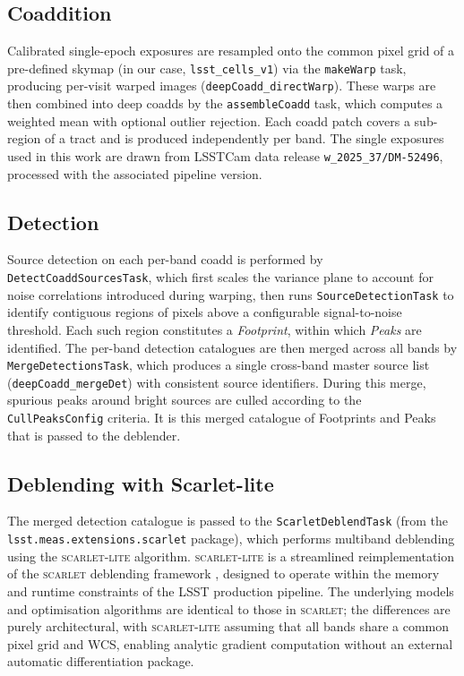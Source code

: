 \documentclass[DM,lsstdraft,authoryear,toc]{lsstdoc}
\newcommand{\scarlet}{\textsc{scarlet}\xspace}
\newcommand{\scarletlite}{\textsc{scarlet-lite}\xspace}
\newcommand{\task}[1]{\texttt{#1}\xspace}
\begin{document}
\subsection{Coaddition}
\label{sec:coaddition}

Calibrated single-epoch exposures are resampled onto the common pixel grid of
a pre-defined skymap (in our case, \texttt{lsst\_cells\_v1}) via the
\task{makeWarp} task, producing per-visit warped images
(\texttt{deepCoadd\_directWarp}). These warps are then combined into deep
coadds by the \task{assembleCoadd} task, which computes a weighted mean with
optional outlier rejection. Each coadd patch covers a sub-region of a tract
and is produced independently per band. The single exposures used in this work
are drawn from LSSTCam data release \texttt{w\_2025\_37/DM-52496}, processed
with the associated pipeline version.

\subsection{Detection}
\label{sec:detection}

Source detection on each per-band coadd is performed by
\task{DetectCoaddSourcesTask}, which first scales the variance plane to
account for noise correlations introduced during warping, then runs
\task{SourceDetectionTask} to identify contiguous regions of pixels above a
configurable signal-to-noise threshold. Each such region constitutes a
\emph{Footprint}, within which \emph{Peaks} are identified. The per-band
detection catalogues are then merged across all bands by
\task{MergeDetectionsTask}, which produces a single cross-band master source
list (\texttt{deepCoadd\_mergeDet}) with consistent source identifiers.
During this merge, spurious peaks around bright sources are culled according
to the \texttt{CullPeaksConfig} criteria. It is this merged catalogue of
Footprints and Peaks that is passed to the deblender.

\subsection{Deblending with Scarlet-lite}
\label{sec:scarlet}
\label{sec:deblending_meas}

The merged detection catalogue is passed to the \task{ScarletDeblendTask}
(from the \texttt{lsst.meas.extensions.scarlet} package), which performs
multiband deblending using the \scarletlite algorithm.
\scarletlite is a streamlined reimplementation
of the \scarlet deblending framework \citep{Melchior2018}, designed to operate
within the memory and runtime constraints of the LSST production pipeline. The
underlying models and optimisation algorithms are identical to those in
\scarlet; the differences are purely architectural, with \scarletlite assuming
that all bands share a common pixel grid and WCS, enabling analytic gradient
computation without an external automatic differentiation package.
\end{document}
